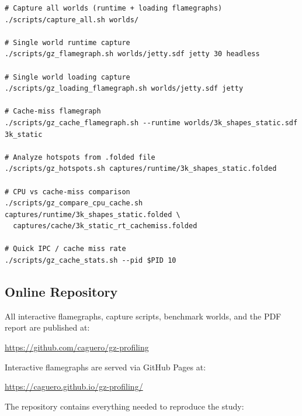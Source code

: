 \documentclass[11pt, a4paper]{article}
\begin{document}
\begin{verbatim}
# Capture all worlds (runtime + loading flamegraphs)
./scripts/capture_all.sh worlds/

# Single world runtime capture
./scripts/gz_flamegraph.sh worlds/jetty.sdf jetty 30 headless

# Single world loading capture
./scripts/gz_loading_flamegraph.sh worlds/jetty.sdf jetty

# Cache-miss flamegraph
./scripts/gz_cache_flamegraph.sh --runtime worlds/3k_shapes_static.sdf 3k_static

# Analyze hotspots from .folded file
./scripts/gz_hotspots.sh captures/runtime/3k_shapes_static.folded

# CPU vs cache-miss comparison
./scripts/gz_compare_cpu_cache.sh captures/runtime/3k_shapes_static.folded \
  captures/cache/3k_static_rt_cachemiss.folded

# Quick IPC / cache miss rate
./scripts/gz_cache_stats.sh --pid $PID 10
\end{verbatim}

\subsection{Online Repository}

All interactive flamegraphs, capture scripts, benchmark worlds, and the PDF report are published at:

\begin{center}
\url{https://github.com/caguero/gz-profiling}
\end{center}

Interactive flamegraphs are served via GitHub Pages at:

\begin{center}
\url{https://caguero.github.io/gz-profiling/}
\end{center}

The repository contains everything needed to reproduce the study:
\end{document}

